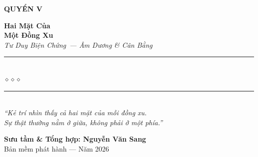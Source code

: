 \begin{titlepage}
\begin{center}
  \begin{tcolorbox}[
    width=6.5cm,
    colback=truyengold!20,
    colframe=truyengold!80!black,
    arc=4pt,
    boxrule=1.5pt,
    halign=center
  ]
    {\fontsize{18}{22}\selectfont\bfseries\color{truyenred!80!black}
     QUYỂN V}
  \end{tcolorbox}
  \vspace{0.8cm}

  {\fontsize{38}{45}\selectfont\bfseries\color{truyenred!80!black}
    Hai Mặt Của}\\[0.4cm]
  {\fontsize{38}{45}\selectfont\bfseries\color{truyengold!80!black}
    Một Đồng Xu}\\[0.4cm]

  {\fontsize{16}{20}\selectfont\color{truyengold!90!black}\itshape
    Tư Duy Biện Chứng~--- Âm Dương \& Cân Bằng}\\[1cm]

  {\color{truyenblue!60}\rule{6cm}{1pt}}\\[5pt]
  {\color{truyengold!80!black}\large$\diamond$\hspace{1cm}$\diamond$\hspace{1cm}$\diamond$}\\[5pt]
  {\color{truyenblue!60}\rule{6cm}{1pt}}\\[1.5cm]

  {\normalsize\itshape\color{truyenblue!90!black}
   ``Kẻ trí nhìn thấy cả hai mặt của mỗi đồng xu.\\
   Sự thật thường nằm ở giữa, không phải ở một phía.''}

  \vfill

  {\fontsize{16}{20}\selectfont\bfseries\color{truyenblue!90!black}
    Sưu tầm \& Tổng hợp: \textbf{Nguyễn Văn Sang}}\\[0.4cm]

  {\small\color{gray} Bản mềm phát hành --- Năm 2026}\\[0.5cm]
\end{center}

\afterpage{\nopagecolor}
\end{titlepage}